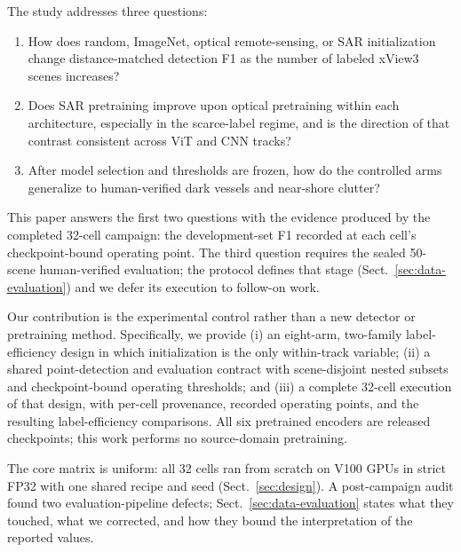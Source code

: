 

The study addresses three questions:

\begin{enumerate}
  \item How does random, ImageNet, optical remote-sensing, or SAR
    initialization change distance-matched detection F1 as the number of
    labeled xView3 scenes increases?
  \item Does SAR pretraining improve upon optical pretraining within each
    architecture, especially in the scarce-label regime, and is the direction
    of that contrast consistent across ViT and CNN tracks?
  \item After model selection and thresholds are frozen, how do the controlled
    arms generalize to human-verified dark vessels and near-shore clutter?
\end{enumerate}

This paper answers the first two questions with the evidence produced by the
completed 32-cell campaign: the development-set F1 recorded at each cell's
checkpoint-bound operating point. The third question requires the sealed
50-scene human-verified evaluation; the protocol defines that stage
(Sect.~\ref{sec:data-evaluation}) and we defer its execution to follow-on
work.

Our contribution is the experimental control rather than a new detector or
pretraining method. Specifically, we provide (i) an eight-arm, two-family
label-efficiency design in which initialization is the only within-track
variable; (ii) a shared point-detection and evaluation contract with
scene-disjoint nested subsets and checkpoint-bound operating thresholds; and
(iii) a complete 32-cell execution of that design, with per-cell provenance,
recorded operating points, and the resulting label-efficiency comparisons.
All six pretrained encoders are released checkpoints; this work performs no
source-domain pretraining.

The core matrix is uniform: all 32 cells ran from scratch on V100 GPUs in
strict FP32 with one shared recipe and seed
(Sect.~\ref{sec:design}). A post-campaign audit found two evaluation-pipeline
defects; Sect.~\ref{sec:data-evaluation} states what they touched, what we
corrected, and how they bound the interpretation of the reported values.

